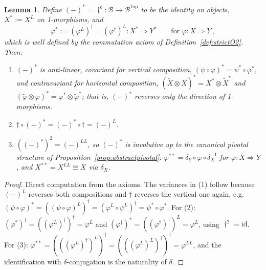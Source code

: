 \documentclass[11pt]{article}
\newtheorem{lemma}[theorem]{Lemma}
\theoremstyle{definition}
\newcommand{\cB}{\mathcal{B}}
\newcommand{\op}{\mathrm{op}}
\newcommand{\dg}{\dagger}
\begin{document}
\begin{lemma}
\label{lem:conjugation}
Define $(-)^* = \dg^b \colon \cB \to \cB^{1\op}$ to be the identity on objects, $X^* := X^L$ on 1-morphisms, and
\begin{equation}
  \varphi^* := (\varphi^L)^\dg = (\varphi^\dg)^L \colon X^* \Longrightarrow Y^*
  \qquad \text{for } \varphi \colon X \Rightarrow Y \, ,
\end{equation}
which is well defined by the commutation axiom of Definition~\ref{def:strictO2}. Then:
\begin{enumerate}
  \item $(-)^*$ is anti-linear, \emph{covariant} for vertical composition, $(\psi \circ \varphi)^* = \psi^* \circ \varphi^*$, and contravariant for horizontal composition, $(\widetilde{X} \otimes X)^* = X^* \otimes \widetilde{X}^*$ and $(\widetilde{\varphi} \otimes \varphi)^* = \varphi^* \otimes \widetilde{\varphi}^*$; that is, $(-)^*$ reverses only the direction of 1-morphisms.
  \item $\dg \circ (-)^* = (-)^* \circ \dg = (-)^L$.
  \item $((-)^*)^2 = (-)^{LL}$, so $(-)^*$ is involutive up to the canonical pivotal structure of Proposition~\ref{prop:abstractpivotal}: $\varphi^{**} = \delta_Y \circ \varphi \circ \delta_X^{-1}$ for $\varphi \colon X \Rightarrow Y$, and $X^{**} = X^{LL} \cong X$ via $\delta_X$.
\end{enumerate}
\end{lemma}

\begin{proof}
Direct computation from the axioms. The variances in (1) follow because $(-)^L$ reverses both compositions and $\dg$ reverses the vertical one again, e.g.\ $(\psi \circ \varphi)^* = ((\psi \circ \varphi)^L)^\dg = (\varphi^L \circ \psi^L)^\dg = \psi^* \circ \varphi^*$. For (2): $(\varphi^*)^\dg = ((\varphi^L)^\dg)^\dg = \varphi^L$ and $(\varphi^\dg)^* = ((\varphi^\dg)^\dg)^L = \varphi^L$, using $\dg^2 = \mathrm{id}$. For (3): $\varphi^{**} = (((\varphi^L)^\dg)^L)^\dg = (((\varphi^L)^L)^\dg)^\dg = \varphi^{LL}$, and the identification with $\delta$-conjugation is the naturality of $\delta$.
\end{proof}
\end{document}
